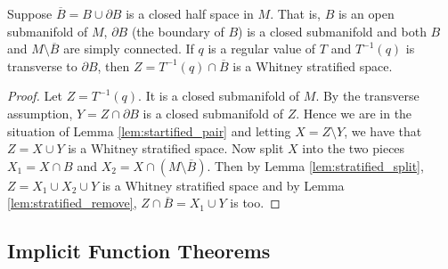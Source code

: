 \begin{lem}
Suppose $\overline B = B \cup \partial B$ is a closed half space in $M$. That is, $B$ is an open submanifold of $M$, $\partial B$ (the boundary of $B$) is a closed submanifold and both $B$ and $M\setminus \overline{B}$ are simply connected. If $q$ is a regular value of $T$ and $T^{-1}(q)$ is transverse to $\partial B$, then $Z = T^{-1}(q) \cap \overline B$ is a Whitney stratified space.

\begin{proof}
Let $Z = T^{-1}(q)$. It is a closed submanifold of $M$. By the transverse assumption, $Y = Z\cap \partial B$ is a closed submanifold of $Z$. Hence we are in the situation of Lemma \ref{lem:startified_pair} and letting $X = Z\setminus Y$, we have that $Z = X \cup Y$ is a Whitney stratified space. Now split $X$ into the two pieces $X_1 = X \cap B$ and $X_2 = X \cap (M \setminus \overline{B})$. Then by Lemma \ref{lem:stratified_split}, $Z = X_1 \cup X_2 \cup Y$ is a Whitney stratified space and by Lemma \ref{lem:stratified_remove}, $Z \cap \overline{B} = X_1 \cup Y$ is too.
\end{proof}
\end{lem}


\subsection{Implicit Function Theorems}
\label{sub:Implicit Function Theorems}



